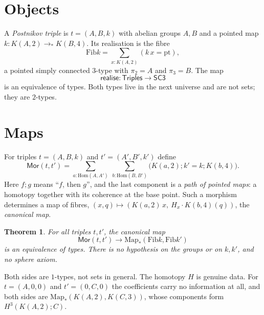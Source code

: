 \documentclass[11pt]{amsart}
\newtheorem{theorem}{Theorem}
\theoremstyle{remark}
\newcommand{\Fib}{\mathrm{Fib}}
\newcommand{\Map}{\mathrm{Map}_*}
\newcommand{\Mor}{\mathsf{Mor}}
\newcommand{\Hom}{\mathrm{Hom}}
\newcommand{\Tri}{\mathsf{Triples}}
\newcommand{\SCt}{\mathsf{SC3}}
\newcommand{\cmp}{\mathbin{;}}
\newcommand{\real}{\mathsf{realise}}
\begin{document}
\section{Objects}

A \emph{Postnikov triple} is $t=(A,B,k)$ with abelian groups $A,B$ and a pointed
map $k:K(A,2)\to_*K(B,4)$. Its realisation is the fibre
\[\Fib k=\textstyle\sum_{x:K(A,2)}(k\,x=\mathrm{pt}),\]
a pointed simply connected $3$-type with $\pi_2=A$ and $\pi_3=B$. The map
\[\real:\Tri\to\SCt\]
is an equivalence of types.
Both types live in the next universe and are not sets; they are $2$-types.

\section{Maps}\label{sec:maps}

For triples $t=(A,B,k)$ and $t'=(A',B',k')$ define
\[\Mor(t,t')=\sum_{a:\Hom(A,A')}\ \sum_{b:\Hom(B,B')}\big(K(a,2)\cmp k'=k\cmp K(b,4)\big).\]
Here $f\cmp g$ means ``$f$, then $g$'', and the last component is a
\emph{path of pointed maps}: a homotopy together with its coherence at the base
point. Such a morphism determines a map of fibres, $(x,q)\mapsto(K(a,2)\,x,\ H_x\cdot
K(b,4)(q))$, the \emph{canonical map}.

\begin{theorem}\label{thm:maps}
For all triples $t,t'$, the canonical map
\[\Mor(t,t')\longrightarrow\Map(\Fib k,\Fib k')\]
is an equivalence of types. There is no hypothesis on the groups or on $k,k'$,
and no sphere axiom.
\end{theorem}

Both sides are $1$-types, not sets in general. The homotopy $H$ is genuine data.
For $t=(A,0,0)$ and $t'=(0,C,0)$ the coefficients carry no information at all,
and both sides are $\Map(K(A,2),K(C,3))$, whose components form
$H^3(K(A,2);C)$.
\end{document}
